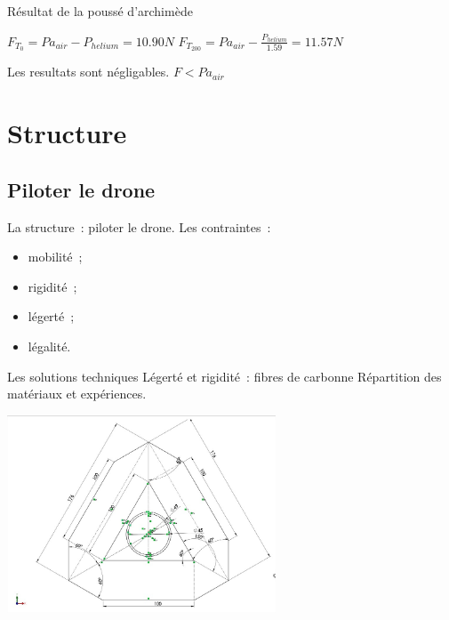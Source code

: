 \documentclass{beamer}
\begin{document}
\begin{frame}{Résultat de la poussé d'archimède}
  \begin{center}
    $\displaystyle{F_{T_0} = Pa_{air} - P_{helium} = 10.90 N}$
    \bigbreak
    $\displaystyle{F_{T_{200}} = Pa_{air} - \frac{P_{helium}}{1.59} = 11.57 N}$ \\
  \end{center}
  Les resultats sont négligables. $F < Pa_{air}$
\end{frame}

\section{Structure}

\subsection{Piloter le drone}

\begin{frame}
  La structure~: piloter le drone.
  Les contraintes~:
  \begin{itemize}
    \item mobilité~;
    \item rigidité~;
    \item légerté~;
    \item légalité.
  \end{itemize}
\end{frame}

\begin{frame}{Les solutions techniques}
  Légerté et rigidité~: fibres de carbonne Répartition des matériaux et expériences.
  \begin{center}
    \includegraphics[width=8cm]{../Images/plan_structure.jpg}
  \end{center}
\end{frame}
\end{document}
